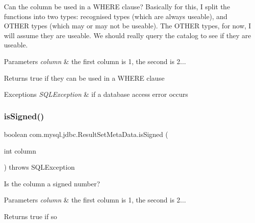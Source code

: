 Can the column be used in a W\+H\+E\+RE clause? Basically for this, I split the functions into two types\+: recognised types (which are always useable), and O\+T\+H\+ER types (which may or may not be useable). The O\+T\+H\+ER types, for now, I will assume they are useable. We should really query the catalog to see if they are useable.


\begin{DoxyParams}{Parameters}
{\em column} & the first column is 1, the second is 2...\\
\hline
\end{DoxyParams}
\begin{DoxyReturn}{Returns}
true if they can be used in a W\+H\+E\+RE clause
\end{DoxyReturn}

\begin{DoxyExceptions}{Exceptions}
{\em S\+Q\+L\+Exception} & if a database access error occurs \\
\hline
\end{DoxyExceptions}
\mbox{\label{classcom_1_1mysql_1_1jdbc_1_1_result_set_meta_data_ae7aab7c643d23eb2ffd6a211abb9ac8f}} 
\subsubsection{\texorpdfstring{is\+Signed()}{isSigned()}}
{\footnotesize\ttfamily boolean com.\+mysql.\+jdbc.\+Result\+Set\+Meta\+Data.\+is\+Signed (\begin{DoxyParamCaption}\item[{int}]{column }\end{DoxyParamCaption}) throws S\+Q\+L\+Exception}

Is the column a signed number?


\begin{DoxyParams}{Parameters}
{\em column} & the first column is 1, the second is 2...\\
\hline
\end{DoxyParams}
\begin{DoxyReturn}{Returns}
true if so
\end{DoxyReturn}

